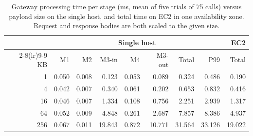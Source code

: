 \begin{table}[t]
\centering
\caption{Gateway processing time per stage (ms, mean of five trials of 75 calls) versus payload size on the single host, and total time on EC2 in one availability zone. Request and response bodies are both scaled to the given size.}
\label{tab:middleware}
\small
\setlength{\tabcolsep}{2.2pt}
\begin{tabular}{r rrrrr rr r}
\toprule
 & \multicolumn{7}{c}{Single host} & EC2 \\
\cmidrule(lr){2-8}\cmidrule(lr){9-9}
KB & M1 & M2 & M3-in & M4 & M3-out & Total & P99 & Total \\
\midrule
1 & 0.050 & 0.008 & 0.123 & 0.053 & 0.089 & 0.324 & 0.486 & 0.190 \\
4 & 0.042 & 0.007 & 0.340 & 0.061 & 0.202 & 0.653 & 0.832 & 0.416 \\
16 & 0.046 & 0.007 & 1.334 & 0.108 & 0.756 & 2.251 & 2.939 & 1.317 \\
64 & 0.052 & 0.009 & 4.848 & 0.261 & 2.687 & 7.857 & 8.386 & 4.937 \\
256 & 0.067 & 0.011 & 19.843 & 0.872 & 10.771 & 31.564 & 33.126 & 19.022 \\
\bottomrule
\end{tabular}
\end{table}
